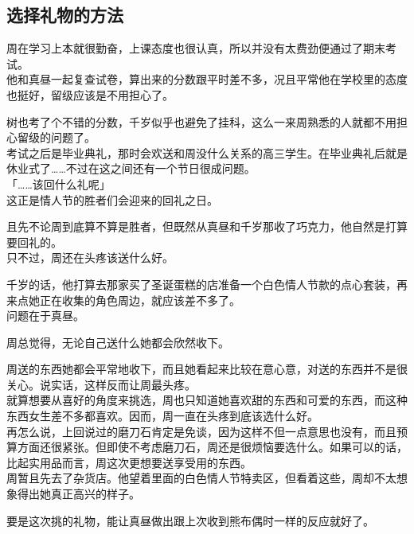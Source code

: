 \subsection{选择礼物的方法}

周在学习上本就很勤奋，上课态度也很认真，所以并没有太费劲便通过了期末考试。\\

他和真昼一起复查试卷，算出来的分数跟平时差不多，况且平常他在学校里的态度也挺好，留级应该是不用担心了。

树也考了个不错的分数，千岁似乎也避免了挂科，这么一来周熟悉的人就都不用担心留级的问题了。\\

考试之后是毕业典礼，那时会欢送和周没什么关系的高三学生。在毕业典礼后就是休业式了……不过在这之间还有一个节日很成问题。\\

「……该回什么礼呢」\\

这正是情人节的胜者们会迎来的回礼之日。

且先不论周到底算不算是胜者，但既然从真昼和千岁那收了巧克力，他自然是打算要回礼的。\\

只不过，周还在头疼该送什么好。

千岁的话，他打算去那家买了圣诞蛋糕的店准备一个白色情人节款的点心套装，再来点她正在收集的角色周边，就应该差不多了。\\

问题在于真昼。

周总觉得，无论自己送什么她都会欣然收下。

周送的东西她都会平常地收下，而且她看起来比较在意心意，对送的东西并不是很关心。说实话，这样反而让周最头疼。\\

就算想要从喜好的角度来挑选，周也只知道她喜欢甜的东西和可爱的东西，而这种东西女生差不多都喜欢。因而，周一直在头疼到底该选什么好。\\

再怎么说，上回说过的磨刀石肯定是免谈，因为这样不但一点意思也没有，而且预算方面还很紧张。但即使不考虑磨刀石，周还是很烦恼要选什么。如果可以的话，比起实用品而言，周这次更想要送享受用的东西。\\

周暂且先去了杂货店。他望着里面的白色情人节特卖区，但看着这些，周却不太想象得出她真正高兴的样子。

要是这次挑的礼物，能让真昼做出跟上次收到熊布偶时一样的反应就好了。\\

